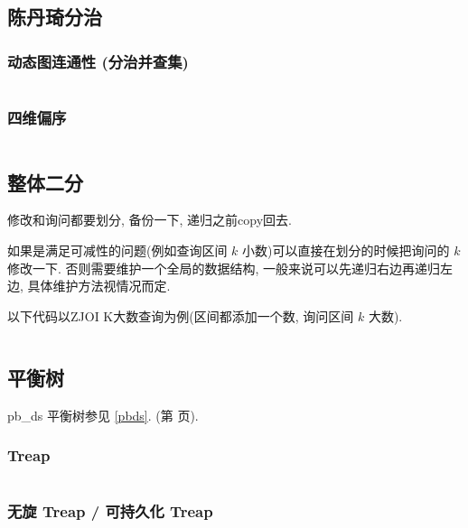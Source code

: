 \documentclass[a4paper, twoside]{article}
\begin{document}
\begin{multicols}{2}
					
	
			\subsection{陈丹琦分治}
				\subsubsection{动态图连通性 (分治并查集)}
					\inputminted{cpp}{../src/datastructure/分治并查集.cpp}

				\subsubsection{四维偏序}
					\inputminted{cpp}{../src/datastructure/CDQ分治.cpp}
	
			\subsection{整体二分}
				修改和询问都要划分, 备份一下, 递归之前copy回去.

				如果是满足可减性的问题(例如查询区间 $k$ 小数)可以直接在划分的时候把询问的 $k$ 修改一下. 否则需要维护一个全局的数据结构, 一般来说可以先递归右边再递归左边, 具体维护方法视情况而定.

				以下代码以ZJOI K大数查询为例(区间都添加一个数, 询问区间 $k$ 大数).

				\inputminted{cpp}{../src/datastructure/整体二分.cpp}

	
	
			\subsection{平衡树}
				pb\_ds 平衡树参见 \ref{pbds}. (第 \pageref{pbds} 页).

				\subsubsection{Treap}
					\inputminted{cpp}{../src/datastructure/Treap.cpp}
					
				\subsubsection{无旋 Treap / 可持久化 Treap}
					\inputminted{cpp}{../src/datastructure/无旋Treap.cpp}
		

\end{multicols}
\end{document}
